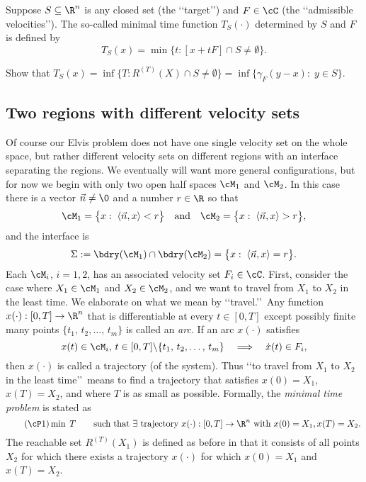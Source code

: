 \documentclass[12pt]{article}
\begin{document}
Suppose $S\subseteq\R^n$ is any closed set (the \lq\lq target\rq\rq) and $F\in\cC$ (the \lq\lq admissible velocities\rq\rq).  The so-called minimal time function $T_S(\cdot)$ determined by $S$ and
$F$ is defined by
\[
T_S(x)=\min\biggl\{t:[x+tF]\cap S \not= \emptyset\biggr\}.
\]

{\blue
\begin{exer}
Show that $T_{S}(x)=\inf\bigl\{T:R^{(T)}(X)\cap S\not=\emptyset\bigr\}=\inf\bigl\{\gamma_{F}(y-x):\;y\in S\bigr\}$.
\end{exer}
}

\subsection{Two regions with different velocity sets}
Of course our Elvis problem does not have one single velocity set on the whole space, but rather different velocity sets on different regions with an interface separating the regions.  We eventually will want more general configurations, but for now we begin with only two open half spaces $\cM_1$ and $\cM_2$.  In this case there is a vector $\vec n\not=\0$ and a number $r\in\R$ so that 
\[
\cM_1=\bigl\{x:\;\langle\vec n,x\rangle < r\bigr\}\quad\text{and}\quad
\cM_2=\bigl\{x:\;\langle\vec n,x\rangle > r\bigr\},
\]
and the interface is 
\[
\Sigma:=\bdry(\cM_1)\cap \bdry(\cM_2)=\bigl\{x:\;\langle\vec n,x\rangle = r\bigr\}.
\]
Each $\cM_i$, $i=1,2$, has an associated velocity set $F_i\in\cC$.  First, consider the case where $X_1\in\cM_1$ and $X_2\in\cM_2$, and we want to travel from $X_1$ to $X_2$ in the least time.  We elaborate on what we mean by \lq\lq travel.\rq\rq\ Any function $x(\cdot):[0,T]\to\R^n$ that is differentiable at every $t\in[0,T]$ except possibly finite many points $\{t_1,\,t_2,\dots,\,t_m\}$ is called an {\it arc}.  If an arc $x(\cdot)$ satisfies
\[
x(t)\in \cM_i,\,t\in[0,T]\backslash\{t_1,\,t_2,\dots,\,t_m\}\quad\Longrightarrow\quad
\dot x(t)\in F_i,
\]  
then $x(\cdot)$ is called a trajectory (of the system).  Thus \lq\lq to travel from $X_1$ to $X_2$ in the least time\rq\rq\ means to find a trajectory that satisfies $x(0)=X_1$, $x(T)=X_2$, and where $T$ is as small as possible.
Formally, the {\it minimal time problem} is stated as
\begin{equation}\label{eq: Elvis1}\tag{$\cP1$}
\min\; T\qquad\text{such that }\exists\text{ trajectory }x(\cdot):[0,T]\to\R^n\text{ with }x(0)=X_1, x(T)=X_2.
\end{equation} 
The reachable set $R^{(T)}(X_1)$ is defined as before in that it consists of all points $X_2$ for which there exists a trajectory $x(\cdot)$ for which $x(0)=X_1$ and $x(T)=X_2$.
\end{document}
